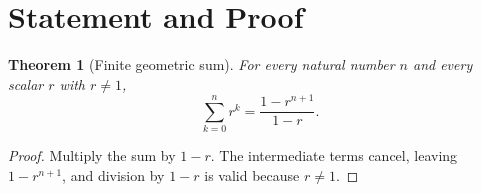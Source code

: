 \documentclass[11pt]{article}
\newtheorem{theorem}{Theorem}
\begin{document}
\section*{Statement and Proof}

\begin{theorem}[Finite geometric sum]
For every natural number $n$ and every scalar $r$ with $r \ne 1$,
\[
  \sum_{k=0}^{n} r^k = \frac{1-r^{n+1}}{1-r}.
\]
\end{theorem}

\begin{proof}
Multiply the sum by $1-r$. The intermediate terms cancel, leaving
$1-r^{n+1}$, and division by $1-r$ is valid because $r \ne 1$.
\end{proof}
\end{document}
